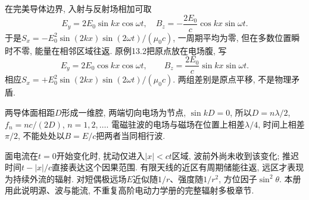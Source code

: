 \label{tb:standing-wave}
在完美导体边界, 入射与反射场相加可取
\[E_y=2E_0\sin kx\cos\omega t,\quad
B_z=-\frac{2E_0}c\cos kx\sin\omega t.\]
于是$S_x=-E_0^2\sin(2kx)\sin(2\omega t)/(\mu_0c)$, 一周期平均为零, 但在多数位置瞬时不零, 能量在相邻区域往返. 原例13.2把原点放在电场腹, 写
\[E_y=2E_0\cos kx\cos\omega t,\qquad B_z=\frac{2E_0}c\sin kx\sin\omega t.\]
相应$S_x=+E_0^2\sin(2kx)\sin(2\omega t)/(\mu_0c)$.
两组差别是原点平移, 不是物理矛盾.

两导体面相距$D$形成一维腔, 两端切向电场为节点, $\sin kD=0$, 所以$D=n\lambda/2$, $f_n=nc/(2D)$, $n=1,2,\ldots$. 電磁驻波的电场与磁场在位置上相差$\lambda/4$, 时间上相差$\pi/2$, 不能处处以$B=E/c$把两者当同相行波.

面电流在$t=0$开始变化时, 扰动仅进入$|x|<ct$区域, 波前外尚未收到该变化; 推迟时间$t-|x|/c$直接表达这个因果范围. 有限天线的近区有周期储能往返, 远区才表现为持续外流的辐射. 对短偶极远场$E$近似随$1/r$、强度随$1/r^2$, 方位因子$\sin^2\theta$. 本册用此说明源、波与能流, 不重复高阶电动力学册的完整辐射多极章节.
